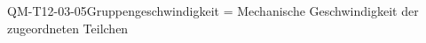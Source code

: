 
\begin{CONC}{QM-T12-03-05}{Gruppengeschwindigkeit = Mechanische Geschwindigkeit der zugeordneten Teilchen}
\end{CONC}
